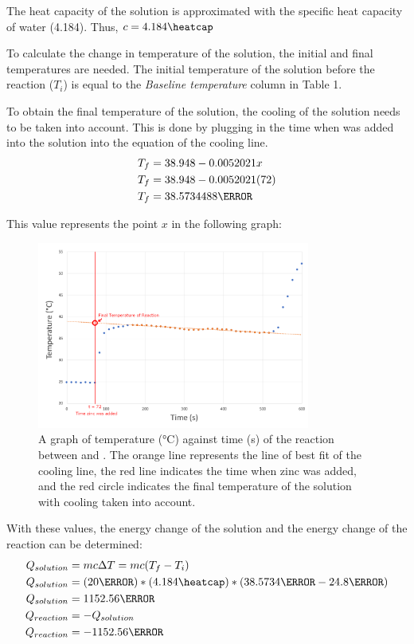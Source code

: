 \documentclass[12pt, notitlepage, letterpaper]{report}
\begin{document}
The heat capacity of the solution is approximated with the specific heat capacity of water (4.184\heatcap). Thus, $c = 4.184\heatcap$

To calculate the change in temperature of the solution, the initial and final temperatures are needed. The initial temperature of the solution before the reaction ($T_i$) is equal to the \textit{Baseline temperature} column in Table 1.

To obtain the final temperature of the solution, the cooling of the solution needs to be taken into account. This is done by plugging in the time when  was added into the solution into the equation of the cooling line.
\begin{align*}
	T_f & = 38.948 - 0.0052021x    \\
	T_f & = 38.948 - 0.0052021(72) \\
	T_f & = 38.5734488\celsius
\end{align*}

This value represents the point $x$ in the following graph:

\begin{figure}[h!]
	\caption{A graph of temperature (\unit{\celsius}) against time (\unit{\second}) of the reaction between  and . The orange line represents the line of best fit of the cooling line, the red line indicates the time when zinc was added, and the red circle indicates the final temperature of the solution with cooling taken into account.}
	\centerline{\noindent\includegraphics[width=0.8\textwidth]{time-vs-temperature-marked.png}}
\end{figure}

With these values, the energy change of the solution and the energy change of the reaction can be determined:
\begin{align*}
	Q_{solution} & = mc\Delta T = mc(T_f - T_i)
	\\
	Q_{solution} & = (20\gram) * (4.184\heatcap) * (38.5734\celsius - 24.8\celsius)
	\\
	Q_{solution} & = 1152.56\joule
	\\
	Q_{reaction} & = -Q_{solution}
	\\
	Q_{reaction} & = -1152.56\joule
\end{align*}
\end{document}
